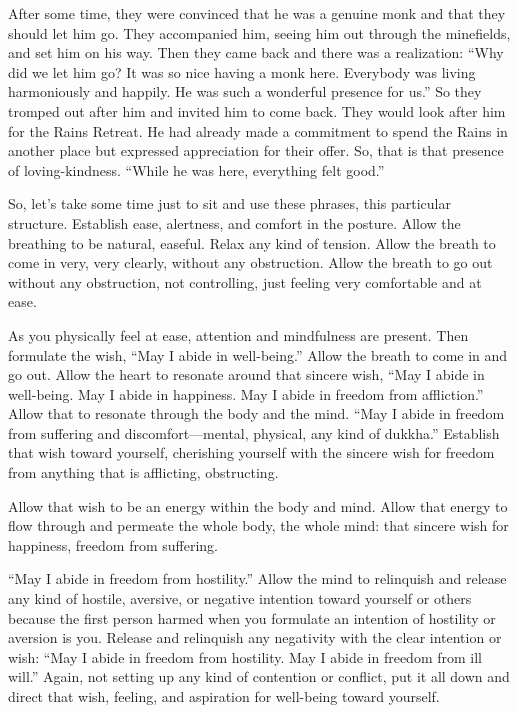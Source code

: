 After some time, they were convinced that he was a genuine monk and that
they should let him go. They accompanied him, seeing him out through the
minefields, and set him on his way. Then they came back and there was a
realization: “Why did we let him go? It was so nice having a monk here.
Everybody was living harmoniously and happily. He was such a wonderful
presence for us.” So they tromped out after him and invited him to come
back. They would look after him for the Rains Retreat. He had already
made a commitment to spend the Rains in another place but expressed
appreciation for their offer. So, that is that presence of
loving-kindness. “While he was here, everything felt good.”

So, let’s take some time just to sit and use these phrases, this
particular structure. Establish ease, alertness, and comfort in the
posture. Allow the breathing to be natural, easeful. Relax any kind of
tension. Allow the breath to come in very, very clearly, without any
obstruction. Allow the breath to go out without any obstruction, not
controlling, just feeling very comfortable and at ease.

As you physically feel at ease, attention and mindfulness are present.
Then formulate the wish, “May I abide in well-being.” Allow the breath
to come in and go out. Allow the heart to resonate around that sincere
wish, “May I abide in well-being. May I abide in happiness. May I abide
in freedom from affliction.” Allow that to resonate through the body and
the mind. “May I abide in freedom from suffering and discomfort—mental,
physical, any kind of dukkha.” Establish that wish toward yourself,
cherishing yourself with the sincere wish for freedom from anything that
is afflicting, obstructing.

Allow that wish to be an energy within the body and mind. Allow that
energy to flow through and permeate the whole body, the whole mind: that
sincere wish for happiness, freedom from suffering.

“May I abide in freedom from hostility.” Allow the mind to relinquish
and release any kind of hostile, aversive, or negative intention toward
yourself or others because the first person harmed when you formulate an
intention of hostility or aversion is you. Release and relinquish any
negativity with the clear intention or wish: “May I abide in freedom
from hostility. May I abide in freedom from ill will.” Again, not
setting up any kind of contention or conflict, put it all down and
direct that wish, feeling, and aspiration for well-being toward
yourself.


